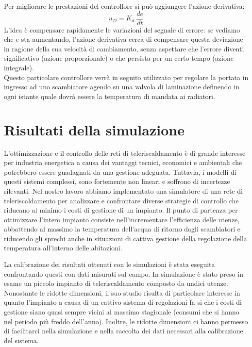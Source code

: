 \documentclass[laurea,oneside,11pt]{USiena_tesiLM}
\begin{document}
Per migliorare le prestazioni del controllore si può aggiungere l'azione derivativa:
\begin{equation}
u_D = K_d \ \dfrac{de}{dt} 
\end{equation}
L'idea è compensare rapidamente le variazioni del segnale di errore: se vediamo che $e$ sta aumentando, l'azione derivativa cerca di compensare questa deviazione in ragione della sua velocità di cambiamento, senza aspettare che l'errore diventi significativo (azione proporzionale) o che persista per un certo tempo (azione integrale). \\

Questo particolare controllore verrà in seguito utilizzato per regolare la portata in ingresso ad uno scambiatore agendo su una valvola di laminazione definendo in ogni istante quale dovrà essere la temperatura di mandata ai radiatori.

\chapter{Risultati della simulazione}
L'ottimizzazione e il controllo delle reti di teleriscaldamento è di grande interesse per industria energetica a causa dei vantaggi tecnici, economici e ambientali che potrebbero essere guadagnati da una gestione adeguata. Tuttavia, i modelli di questi sistemi complessi, sono fortemente non lineari  e soffrono di incertezze rilevanti. Nel nostro lavoro abbiamo implementato una simulatore di una rete di teleriscaldamento per analizzare e confrontare diverse strategie di controllo che riducano al minimo i costi di gestione di un impianto.
Il punto di partenza per ottimizzare l'intero impianto consiste nell'incrementare l'efficienza delle utenze, abbattendo al massimo la temperatura dell'acqua di ritorno dagli scambiatori 
e riducendo gli sprechi anche in situazioni di cattiva gestione 
della regolazione della temperatura all'interno delle abitazioni.

La calibrazione dei risultati ottenuti con le simulazioni è stata eseguita confrontando questi con dati misurati sul campo.
In simulazione è stato preso in esame un piccolo impianto di teleriscaldamento composto da undici utenze. Nonostante le ridotte dimensioni, il suo studio risulta di particolare interesse in quanto l'impianto a causa di un cattivo sistema di regolazioni fa si che i costi di gestione siano quasi sempre vicini al massimo stagionale (consumi che si hanno nel periodo più freddo dell'anno). Inoltre, le ridotte dimensioni ci hanno permesso di facilitarci nella simulazione e nella raccolta dei dati necessari alla calibrazione del sistema.  
\end{document}
